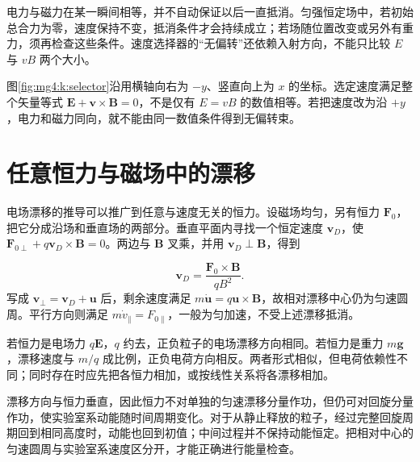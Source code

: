 电力与磁力在某一瞬间相等，并不自动保证以后一直抵消。匀强恒定场中，若初始总合力为零，速度保持不变，抵消条件才会持续成立；若场随位置改变或另外有重力，须再检查这些条件。速度选择器的“无偏转”还依赖入射方向，不能只比较 $E$ 与 $vB$ 两个大小。

图\ref{fig:mg4:k:selector}沿用横轴向右为 $-y$、竖直向上为 $x$ 的坐标。选定速度满足整个矢量等式 $\bm E+\bm v\times\bm B=0$，不是仅有 $E=vB$ 的数值相等。若把速度改为沿 $+y$，电力和磁力同向，就不能由同一数值条件得到无偏转束。



\section{任意恒力与磁场中的漂移}
电场漂移的推导可以推广到任意与速度无关的恒力。设磁场均匀，另有恒力 $\bm F_0$，把它分成沿场和垂直场的两部分。垂直平面内寻找一个恒定速度 $\bm v_D$，使 $\bm F_{0\perp}+q\bm v_D\times\bm B=0$。两边与 $\bm B$ 叉乘，并用 $\bm v_D\perp\bm B$，得到

\[
\bm v_D=\frac{\bm F_0\times\bm B}{qB^2}.
\]
写成 $\bm v_\perp=\bm v_D+\bm u$ 后，剩余速度满足 $m\dot{\bm u}=q\bm u\times\bm B$，故相对漂移中心仍为匀速圆周。平行方向则满足 $m\dot v_\parallel=F_{0\parallel}$，一般为匀加速，不受上述漂移抵消。


若恒力是电场力 $q\bm E$，$q$ 约去，正负粒子的电场漂移方向相同。若恒力是重力 $m\bm g$，漂移速度与 $m/q$ 成比例，正负电荷方向相反。两者形式相似，但电荷依赖性不同；同时存在时应先把各恒力相加，或按线性关系将各漂移相加。


漂移方向与恒力垂直，因此恒力不对单独的匀速漂移分量作功，但仍可对回旋分量作功，使实验室系动能随时间周期变化。对于从静止释放的粒子，经过完整回旋周期回到相同高度时，动能也回到初值；中间过程并不保持动能恒定。把相对中心的匀速圆周与实验室系速度区分开，才能正确进行能量检查。

